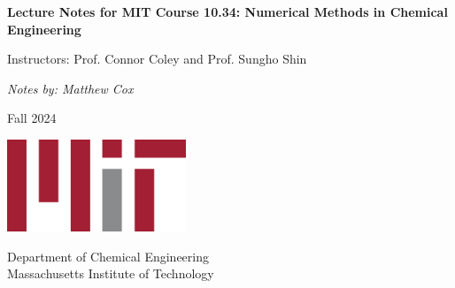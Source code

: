 \begin{titlepage}
    \begin{center}
        \vspace*{1cm}
        
        \Huge
        \textbf{Lecture Notes for MIT Course 10.34: Numerical Methods in Chemical Engineering}
        
        \vspace*{0.5cm}
        \LARGE
        Instructors: Prof. Connor Coley and Prof. Sungho Shin
        
        \vspace*{1.5cm}
        \Large
        \textit{Notes by: Matthew Cox}

        \vspace*{1.5cm}
        Fall 2024
        
        \vspace*{2cm}
        
        \includegraphics[width=0.4\textwidth]{figs/MIT_logo.png}
        
        \Large
        Department of Chemical Engineering\\
        Massachusetts Institute of Technology
        
    \end{center}
\end{titlepage}